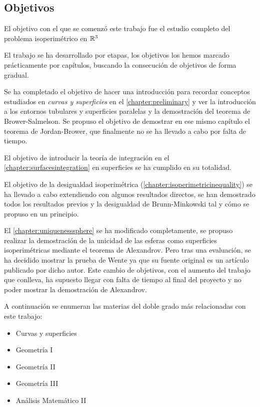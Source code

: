 \subsection{Objetivos}

El objetivo con el que se comenzó este trabajo fue el estudio completo del problema isoperimétrico en $\mathbb{R}^3$

El trabajo se ha desarrollado por etapas, los objetivos los hemos marcado prácticamente por capítulos, buscando la consecución de objetivos de forma gradual. 

Se ha completado el objetivo de hacer una introducción para recordar conceptos estudiados en \emph{curvas y superficies} en el \autoref{chapter:preliminary} y ver la introducción a los entornos tubulares y superficies paralelas y la demostración del teorema de Brower-Salmelson. Se propuso el objetivo de demostrar en ese mismo capítulo el teorema de Jordan-Brower, que finalmente no se ha llevado a cabo por falta de tiempo.

El objetivo de introducir la teoría de integración en el \autoref{chapter:surfacesintegration} en superficies se ha cumplido en su totalidad.

El objetivo de la desigualdad isoperimétrica (\autoref{chapter:isoperimetricinequality}) se ha llevado a cabo extendiendo con algunos resultados directos, se han demostrado todos los resultados previos y la desigualdad de Brunn-Minkowski tal y cómo se propuso en un principio.

El \autoref{chapter:uniquenesssphere} se ha modificado completamente, se propuso realizar la demostración de la unicidad de las esferas como superficies isoperimétricas mediante el teorema de Alexandrov. Pero tras una evaluación, se ha decidido mostrar la prueba de Wente ya que su fuente original es un artículo publicado por dicho autor. Este cambio de objetivos, con el aumento del trabajo que conlleva, ha supuesto llegar con falta de tiempo al final del proyecto y no poder mostrar la demostración de Alexandrov.

A continuación se enumeran las materias del doble grado más relacionadas con este trabajo:
\begin{itemize}
\item Curvas y superficies
\item Geometría I
\item Geometría II
\item Geometría III
\item Análisis Matemático II
\end{itemize}

\newpage
